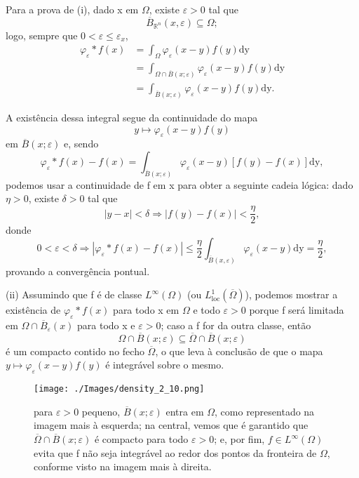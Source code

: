 \documentclass[../distribution_theory_notes.tex]{subfiles}
\begin{document}
\begin{proof*}
  Para a prova de (i), dado x em \(\Omega \), existe \(\varepsilon >0\) tal que 
    \[
      \overline{B}_{\mathbb{R}^{n}}(x, \varepsilon )\subseteq \Omega ;
    \]
    logo, sempre que \(0<\varepsilon \leq \varepsilon_x\),
   \begin{align*}
     \varphi_{\varepsilon }*f(x)&= \int_{\Omega }^{}\varphi_\varepsilon (x-y)f(y) \mathrm{dy}\\ 
                                &= \int_{\Omega \cap \overline{B}(x; \varepsilon )}^{}\varphi_\varepsilon (x-y)f(y) \mathrm{dy}\\ 
                                &= \int_{\overline{B}(x; \varepsilon )}^{} \varphi_\varepsilon (x-y)f(y)\mathrm{dy}.
   \end{align*}

   A existência dessa integral segue da continuidade do mapa 
     \[
       y\mapsto \varphi_\varepsilon (x-y)f(y)
     \]
     em \(\overline{B}(x; \varepsilon )\) e, sendo 
       \[
         \varphi _\varepsilon *f(x)-f(x)=\int_{\overline{B}(x; \varepsilon )}^{}\varphi_{\varepsilon }(x-y)[f(y)-f(x)] \mathrm{dy},
       \]
       podemos usar a continuidade de f em x para obter a seguinte cadeia lógica: dado \(\eta >0\), existe \(\delta >0\) tal que 
         \[
           | y-x |<\delta \Rightarrow | f(y)-f(x) | < \frac{\eta }{2},
         \]
         donde 
           \[
             0<\varepsilon <\delta \Rightarrow | \varphi_\varepsilon *f(x)-f(x) |\leq \frac{\eta }{2}\int_{\overline{B}(x, \varepsilon )}^{}\varphi_\varepsilon(x-y) \mathrm{dy}=\frac{\eta}{2},
           \]
           provando a convergência pontual.

           (ii) Assumindo que f é de classe \(L^{\infty}(\Omega )\) (ou \(L_{\mathrm{loc}}^{1}(\overline{\Omega })\)), podemos mostrar a existência de \(\varphi_\varepsilon *f(x)\) para todo x em \(\Omega \) e todo \(\varepsilon >0\) porque f será limitada em \(\Omega \cap \overline{B}_\varepsilon (x)\) para todo x e \(\varepsilon >0\); caso a f for da outra classe, então 
             \[
               \Omega \cap \overline{B}(x; \varepsilon )\subseteq \overline{\Omega }\cap \overline{B}(x; \varepsilon )
             \]
             é um compacto contido no fecho \(\overline{\Omega }\), o que leva à conclusão de que o mapa \(y\mapsto \varphi_\varepsilon (x-y)f(y)\) é integrável sobre o mesmo.
           \begin{figure}[H]
           \begin{center}
           \texttt{[image: ./Images/density\_2\_10.png]}
           \end{center}
           \caption{para \(\varepsilon >0\) pequeno, \(\overline{B}(x; \varepsilon )\) entra em \(\Omega \), como representado na imagem mais à esquerda; na central, vemos que é garantido que \(\overline{\Omega }\cap \overline{B}(x; \varepsilon )\) é compacto para todo \(\varepsilon >0\); e, por fim, \(f\in L^{\infty}(\Omega )\) evita que f não seja integrável ao redor dos pontos da fronteira de \(\Omega \), conforme visto na imagem mais à direita.}
           \end{figure}


\end{proof*}
\end{document}
